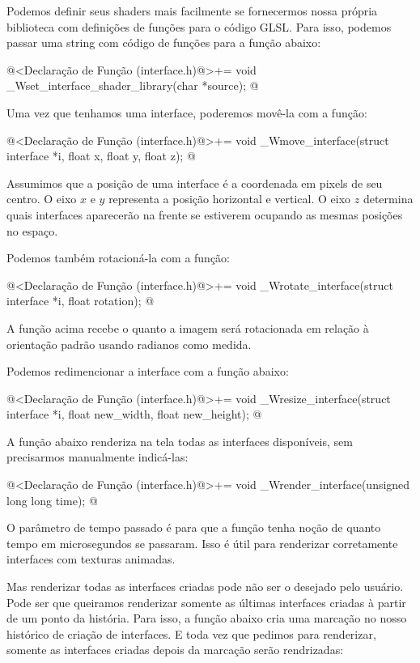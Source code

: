 Podemos definir seus shaders mais facilmente se fornecermos nossa
própria biblioteca com definições de funções para o código GLSL. Para
isso, podemos passar uma string com código de funções para a função
abaixo:

\iniciocodigo
@<Declaração de Função (interface.h)@>+=
void _Wset_interface_shader_library(char *source);
@
\fimcodigo

Uma vez que tenhamos uma interface, poderemos movê-la com a função:

\iniciocodigo
@<Declaração de Função (interface.h)@>+=
void _Wmove_interface(struct interface *i, float x, float y, float z);
@
\fimcodigo

Assumimos que a posição de uma interface é a coordenada em pixels de
seu centro. O eixo $x$ e $y$ representa a posição horizontal e
vertical. O eixo $z$ determina quais interfaces aparecerão na frente
se estiverem ocupando as mesmas posições no espaço.

Podemos também rotacioná-la com a função:

\iniciocodigo
@<Declaração de Função (interface.h)@>+=
void _Wrotate_interface(struct interface *i, float rotation);
@
\fimcodigo

A função acima recebe o quanto a imagem será rotacionada em relação à
orientação padrão usando radianos como medida.

Podemos redimencionar a interface com a função abaixo:

\iniciocodigo
@<Declaração de Função (interface.h)@>+=
void _Wresize_interface(struct interface *i, float new_width, float new_height);
@
\fimcodigo

A função abaixo renderiza na tela todas as interfaces disponíveis, sem
precisarmos manualmente indicá-las:

\iniciocodigo
@<Declaração de Função (interface.h)@>+=
void _Wrender_interface(unsigned long long time);
@
\fimcodigo

O parâmetro de tempo passado é para que a função tenha noção de quanto
tempo em microsegundos se passaram. Isso é útil para renderizar
corretamente interfaces com texturas animadas.

Mas renderizar todas as interfaces criadas pode não ser o desejado
pelo usuário. Pode ser que queiramos renderizar somente as últimas
interfaces criadas à partir de um ponto da história.  Para isso, a
função abaixo cria uma marcação no nosso histórico de criação de
interfaces. E toda vez que pedimos para renderizar, somente as
interfaces criadas depois da marcação serão rendrizadas:

